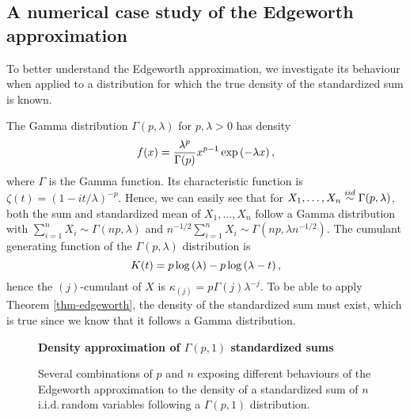 \subsection{A numerical case study of the Edgeworth approximation}

To better understand the Edgeworth approximation, we investigate its behaviour when applied to a distribution for which the true density of the standardized sum is known.

\begin{example} \label{ex-gamma-edge}
    The Gamma distribution $\Gamma(p, \lambda)$ for $p, \lambda > 0$ has density
    \begin{equation*}
        f(x) = \frac{\lambda^p}{\Gamma(p)} x^{p-1} \exp\left(-\lambda x\right),
    \end{equation*}
    where $\Gamma$ is the Gamma function. Its characteristic function is $\zeta(t) = (1 - it/\lambda)^{-p}$. Hence, we can easily see that for $X_1, \ldots, X_n \stackrel{iid}{\sim} \Gamma(p, \lambda)$, both the sum and standardized mean of $X_1, \ldots, X_n$ follow a Gamma distribution with $\sum_{i=1}^n X_i \sim \Gamma(np, \lambda)$ and $n^{-1/2} \sum_{i=1}^n X_i \sim \Gamma(np, \lambda n^{-1/2})$. The cumulant generating function of the $\Gamma(p, \lambda)$ distribution is
    \begin{equation*}
        K(t) = p \log\left(\lambda\right) - p\log\left(\lambda - t\right),
    \end{equation*}
    hence the $(j)$-cumulant of $X$ is $\kappa_{(j)} = p\Gamma(j)\lambda^{-j}$. To be able to apply Theorem \ref{thm-edgeworth}, the density of the standardized sum must exist, which is true since we know that it follows a Gamma distribution.
    

    \begin{figure}[!htbp]
        \textbf{Density approximation of $\Gamma(p,1)$ standardized sums}
        \centering
        \qquad
        \caption{Several combinations of $p$ and $n$ exposing different behaviours of the Edgeworth approximation to the density of a standardized sum  of $n$ i.i.d.\,random variables following a $\Gamma(p, 1)$ distribution.}
        \label{fig-edgeworth}
    \end{figure}


\end{example}

